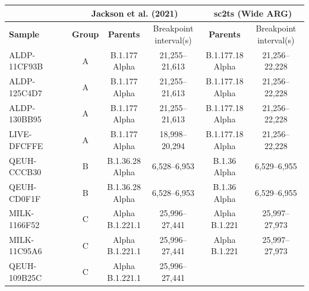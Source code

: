 \documentclass{article}
\begin{document}
\begin{table} \centering
\begin{tabular}{l|c|c|c|c|c} \hline
\multicolumn{1}{c}{} & \multicolumn{3}{c}{\textbf{Jackson et al. (2021)}} &
\multicolumn{2}{c}{\textbf{sc2ts (Wide ARG)}} \\ \hline
\textbf{Sample} &
\textbf{Group} & \textbf{Parents} & \thead{Breakpoint \\
interval(s)} &
\textbf{Parents} & \thead{Breakpoint \\ interval(s)} \\
\hline ALDP-11CF93B & A
    & \thead{B.1.177 \\ Alpha} & 21,255–21,613 & \thead{B.1.177.18 \\ Alpha} &
21,256–22,228 \\
    ALDP-125C4D7 & A & \thead{B.1.177 \\ Alpha} & 21,255–21,613 &
    \thead{B.1.177.18 \\ Alpha} & 21,256–22,228 \\
ALDP-130BB95 & A & \thead{B.1.177 \\ Alpha} & 21,255–21,613 &
    \thead{B.1.177.18 \\ Alpha} & 21,256–22,228 \\
LIVE-DFCFFE & A & \thead{B.1.177 \\ Alpha} & 18,998–20,294 &
    \thead{B.1.177.18 \\ Alpha} & 21,256–22,228 \\
QEUH-CCCB30 & B & \thead{B.1.36.28 \\ Alpha} & 6,528–6,953 &
    \thead{B.1.36 \\ Alpha} & 6,529–6,955 \\
QEUH-CD0F1F & B & \thead{B.1.36.28 \\ Alpha} & 6,528–6,953 &
    \thead{B.1.36 \\ Alpha} & 6,529–6,955 \\
MILK-1166F52 & C & \thead{Alpha \\ B.1.221.1} & 25,996–27,441 &
    \thead{Alpha \\ B.1.221} & 25,997–27,973 \\
MILK-11C95A6 & C & \thead{Alpha \\ B.1.221.1} & 25,996–27,441 &
    \thead{Alpha \\ B.1.221} & 25,997–27,973 \\
QEUH-109B25C & C & \thead{Alpha \\ B.1.221.1} & 25,996–27,441 &

\end{tabular}
\end{table}
\end{document}
